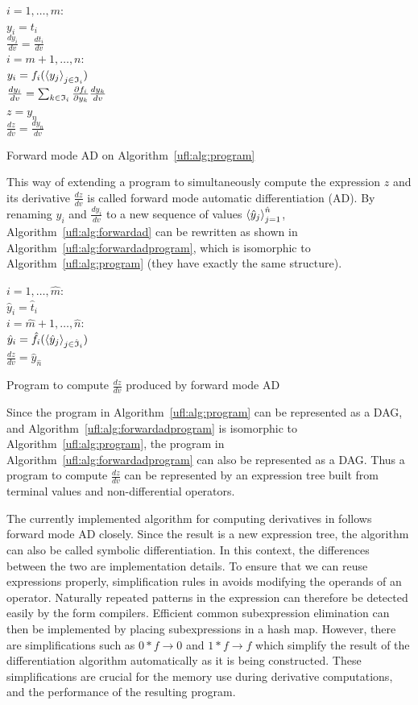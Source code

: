 \begin{algorithm}
\afor $i = 1, \ldots, m$:\\
\tab $y_i = t_i$ \\
\tab $\frac{d y_i}{d v} = \frac{d t_i}{d v}$ \\
\afor $i = m+1, \ldots, n$:\\
\tab $y_i = f_i(\left\langle{y_j}\right\rangle_{j\in\mathfrak{I}_i})$ \\
\tab $\frac{d y_i}{d v} = \sum_{k\in\mathfrak{I}_i} \frac{\partial f_i}{\partial y_k} \frac{d y_k}{d v}$ \\
$z = y_n$ \\
$\frac{d z}{d v} = \frac{d y_n}{d v}$
\caption{Forward mode AD on Algorithm~\ref{ufl:alg:program}}
\label{ufl:alg:forwardad}
\end{algorithm}

This way of extending a program to simultaneously compute the
expression $z$ and its derivative $\frac{d z}{d v}$ is called forward
mode automatic differentiation (AD).  By renaming $y_i$ and $\frac{d
  y_i}{d v}$ to a new sequence of values $\left\langle{\hat y_j}\right\rangle_{j=1}^{\hat
  n}$, Algorithm~\ref{ufl:alg:forwardad} can be rewritten as shown in
Algorithm~\ref{ufl:alg:forwardadprogram}, which is isomorphic to
Algorithm~\ref{ufl:alg:program} (they have exactly the same
structure).
\begin{algorithm}
\afor $i = 1, \ldots, \hat m$:\\
\tab $\hat y_i = \hat t_i$ \\
\afor $i = \hat m + 1, \ldots, \hat n$:\\
\tab $\hat y_i = \hat f_i(\left\langle{\hat y_j}\right\rangle_{j\in\hat{\mathfrak{I}}_i})$ \\
$\frac{d z}{d v} = \hat y_{\hat n}$
\caption{Program to compute $\frac{d z}{d v}$ produced by forward mode AD}
\label{ufl:alg:forwardadprogram}
\end{algorithm}

Since the program in Algorithm~\ref{ufl:alg:program} can be
represented as a DAG, and Algorithm~\ref{ufl:alg:forwardadprogram} is
isomorphic to Algorithm~\ref{ufl:alg:program}, the program in
Algorithm~\ref{ufl:alg:forwardadprogram} can also be represented as a
DAG.  Thus a program to compute $\frac{d z}{d v}$ can be represented
by an expression tree built from terminal values and non-differential
operators.

The currently implemented algorithm for computing derivatives in
\ufl{} follows forward mode AD closely. Since the result is a new
expression tree, the algorithm can also be called symbolic
differentiation. In this context, the differences between the two are
implementation details.  To ensure that we can reuse expressions
properly, simplification rules in \ufl{} avoids modifying the operands
of an operator.  Naturally repeated patterns in the expression can
therefore be detected easily by the form compilers.  Efficient common
subexpression elimination can then be implemented by placing
subexpressions in a hash map.  However, there are simplifications such
as $0*f\rightarrow 0$ and $1*f\rightarrow f$ which simplify the result
of the differentiation algorithm automatically as it is being
constructed.  These simplifications are crucial for the memory use
during derivative computations, and the performance of the resulting
program.

